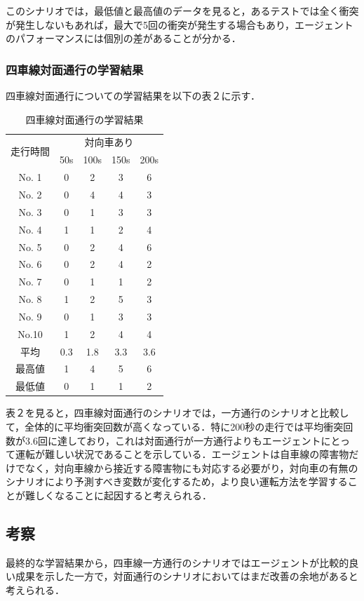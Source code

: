 このシナリオでは，最低値と最高値のデータを見ると，あるテストでは全く衝突が発生しないもあれば，最大で5回の衝突が発生する場合もあり，エージェントのパフォーマンスには個別の差があることが分かる．

\subsubsection{四車線対面通行の学習結果}
四車線対面通行についての学習結果を以下の表２に示す．
\begin{table}[H]
\centering
\caption{四車線対面通行の学習結果}
\label{tab:taimentuukou}
\begin{tabular}{|c|c|c|c|c|}
\hline
\multirow{2}{*}{走行時間} & \multicolumn{4}{c|}{対向車あり} \\ \cline{2-5} 
                           & 50s & 100s & 150s & 200s \\ \hline
No. 1                       & 0   & 2    & 3    & 6    \\ \hline
No. 2                       & 0   & 4    & 4    & 3    \\ \hline
No. 3                       & 0   & 1    & 3    & 3    \\ \hline
No. 4                       & 1   & 1    & 2    & 4    \\ \hline
No. 5                       & 0   & 2    & 4    & 6    \\ \hline
No. 6                       & 0   & 2    & 4    & 2    \\ \hline
No. 7                       & 0   & 1    & 1    & 2    \\ \hline
No. 8                       & 1   & 2    & 5    & 3    \\ \hline
No. 9                       & 0   & 1    & 3    & 3    \\ \hline
No.10                      & 1   & 2    & 4    & 4    \\ \hline
平均                       & 0.3 & 1.8  & 3.3  & 3.6  \\ \hline
最高値                     & 1   & 4    & 5    & 6    \\ \hline
最低値                     & 0   & 1    & 1    & 2    \\ \hline
\end{tabular}
\end{table}
表２を見ると，四車線対面通行のシナリオでは，一方通行のシナリオと比較して，全体的に平均衝突回数が高くなっている．特に200秒の走行では平均衝突回数が3.6回に達しており，これは対面通行が一方通行よりもエージェントにとって運転が難しい状況であることを示している．エージェントは自車線の障害物だけでなく，対向車線から接近する障害物にも対応する必要がり，対向車の有無のシナリオにより予測すべき変数が変化するため，より良い運転方法を学習することが難しくなることに起因すると考えられる．

\subsection{考察}
最終的な学習結果から，四車線一方通行のシナリオではエージェントが比較的良い成果を示した一方で，対面通行のシナリオにおいてはまだ改善の余地があると考えられる．\\








